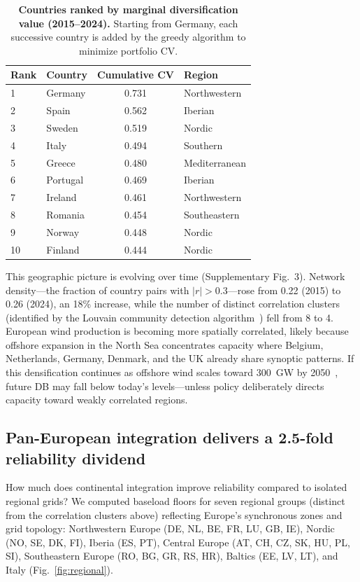 \documentclass[sn-nature]{sn-jnl}%
\begin{document}
\begin{table}[!ht]
\centering
\caption{\textbf{Countries ranked by marginal diversification value (2015--2024).} Starting from Germany, each successive country is added by the greedy algorithm to minimize portfolio CV.}
\label{tab:marginal}
\begin{tabular}{llS[table-format=1.3]l}
\toprule
Rank & Country & {Cumulative CV} & Region \\
 & Germany & 0.731 & Northwestern \\
2 & Spain & 0.562 & Iberian \\
3 & Sweden & 0.519 & Nordic \\
4 & Italy & 0.494 & Southern \\
5 & Greece & 0.480 & Mediterranean \\
6 & Portugal & 0.469 & Iberian \\
7 & Ireland & 0.461 & Northwestern \\
8 & Romania & 0.454 & Southeastern \\
9 & Norway & 0.448 & Nordic \\
10 & Finland & 0.444 & Nordic \\
\bottomrule
\end{tabular}
\end{table}

This geographic picture is evolving over time (Supplementary Fig.~3). Network density---the fraction of country pairs with $|r| > 0.3$---rose from 0.22 (2015) to 0.26 (2024), an 18\% increase, while the number of distinct correlation clusters (identified by the Louvain community detection algorithm~\cite{blondel2008}) fell from 8 to 4. European wind production is becoming more spatially correlated, likely because offshore expansion in the North Sea concentrates capacity where Belgium, Netherlands, Germany, Denmark, and the UK already share synoptic patterns. If this densification continues as offshore wind scales toward 300~GW by 2050~\cite{windeurope2024}, future DB may fall below today's levels---unless policy deliberately directs capacity toward weakly correlated regions.


\subsection{Pan-European integration delivers a 2.5-fold reliability dividend}

How much does continental integration improve reliability compared to isolated regional grids? We computed baseload floors for seven regional groups (distinct from the correlation clusters above) reflecting Europe's synchronous zones and grid topology: Northwestern Europe (DE, NL, BE, FR, LU, GB, IE), Nordic (NO, SE, DK, FI), Iberia (ES, PT), Central Europe (AT, CH, CZ, SK, HU, PL, SI), Southeastern Europe (RO, BG, GR, RS, HR), Baltics (EE, LV, LT), and Italy (Fig.~\ref{fig:regional}).
\end{document}
